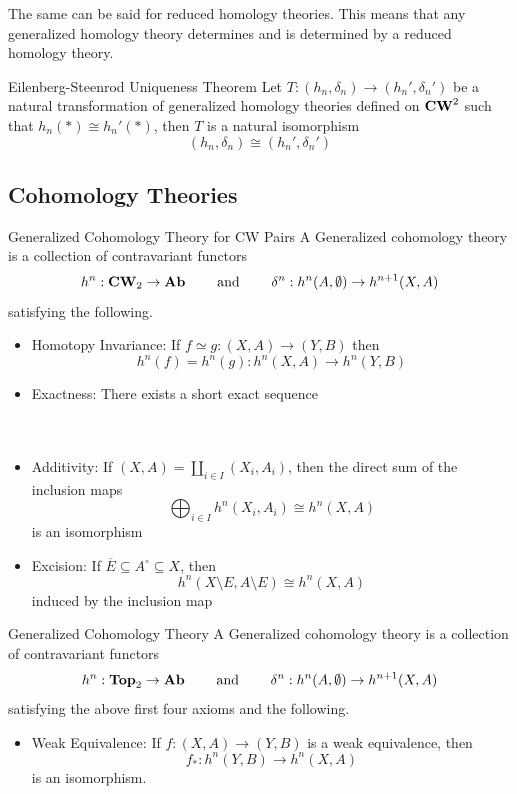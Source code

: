 \documentclass[a4paper]{article}
\begin{document}
The same can be said for reduced homology theories. This means that any generalized homology theory determines and is determined by a reduced homology theory. 

\begin{thm}{Eilenberg-Steenrod Uniqueness Theorem}{} Let $T:(h_n,\delta_n)\to(h_n',\delta_n')$ be a natural transformation of generalized homology theories defined on $\bold{CW}^2$ such that $h_n(\ast)\cong h_n'(\ast)$, then $T$ is a natural isomorphism $$(h_n,\delta_n)\cong(h_n',\delta_n')$$
\end{thm}

\subsection{Cohomology Theories}
\begin{defn}{Generalized Cohomology Theory for CW Pairs}{} A Generalized cohomology theory is a collection of contravariant functors $$h^n:\bold{CW}_2\to\bold{Ab}\;\;\;\;\;\;\;\text{ and }\;\;\;\;\;\;\;\delta^n:h^n(A,\emptyset)\to h^{n+1}(X,A)$$ satisfying the following. 
\begin{itemize}
\item Homotopy Invariance: If $f\simeq g:(X,A)\to(Y,B)$ then $$h^n(f)=h^n(g):h^n(X,A)\to h^n(Y,B)$$
\item Exactness: There exists a short exact sequence \\~\\
~\\
\item Additivity: If $(X,A)=\coprod_{i\in I}(X_i,A_i)$, then the direct sum of the inclusion maps $$\bigoplus_{i\in I}h^n(X_i,A_i)\cong h^n(X,A)$$ is an isomorphism
\item Excision: If $\overline{E}\subseteq A^\circ\subseteq X$, then $$h^n(X\setminus E,A\setminus E)\cong h^n(X,A)$$ induced by the inclusion map
\end{itemize}
\end{defn}

\begin{defn}{Generalized Cohomology Theory}{} A Generalized cohomology theory is a collection of contravariant functors $$h^n:\bold{Top}_2\to\bold{Ab}\;\;\;\;\;\;\;\text{ and }\;\;\;\;\;\;\;\delta^n:h^n(A,\emptyset)\to h^{n+1}(X,A)$$ satisfying the above first four axioms and the following. 
\begin{itemize}
\item Weak Equivalence: If $f:(X,A)\to(Y,B)$ is a weak equivalence, then $$f_\ast:h^n(Y,B)\to h^n(X,A)$$ is an isomorphism. 
\end{itemize}
\end{defn}
\end{document}

